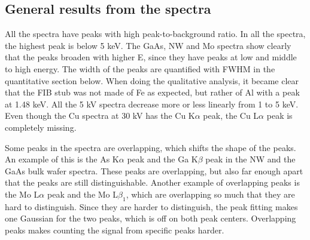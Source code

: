 %
%
%
%
%
%
%
%
%
%
%
%
%
%
%

\subsection{General results from the spectra}
\label{sec:results:qualitative:general}

All the spectra have peaks with high peak-to-background ratio. %
In all the spectra, the highest peak is below 5 keV. %
The GaAs, NW and Mo spectra show clearly that the peaks broaden with higher E, since they have peaks at low and middle to high energy. %
The width of the peaks are quantified with FWHM in the quantitative section below.
When doing the qualitative analysis, it became clear that the FIB stub was not made of Fe as expected, but rather of Al with a peak at 1.48 keV.
All the 5 kV spectra decrease more or less linearly from 1 to 5 keV. %
Even though the Cu spectra at 30 kV has the Cu K$\alpha$ peak, the Cu L$\alpha$ peak is completely missing. %

Some peaks in the spectra are overlapping, which shifts the shape of the peaks.
An example of this is the As K$\alpha$ peak and the Ga K$\beta$ peak in the NW and the GaAs bulk wafer spectra.
These peaks are overlapping, but also far enough apart that the peaks are still distinguishable.
Another example of overlapping peaks is the Mo L$\alpha$ peak and the Mo L$\beta_1$, which are overlapping so much that they are hard to distinguish.
Since they are harder to distinguish, the peak fitting makes one Gaussian for the two peaks, which is off on both peak centers. %
Overlapping peaks makes counting the signal from specific peaks harder.

